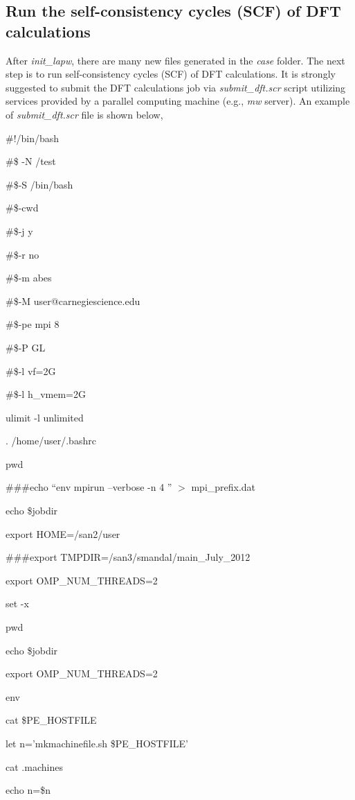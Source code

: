 \documentclass[12 pt]{article}
\begin{document}
  \cleardoublepage

      \subsection{Run the self-consistency cycles (SCF) of DFT calculations}

  After \emph{init\_lapw}, there are many new files generated in the \emph{case} folder. The next step is 
to run self-consistency cycles (SCF) of DFT calculations. It is strongly suggested to submit the DFT calculations 
job via \emph{submit\_dft.scr} script utilizing services provided by a parallel computing machine (e.g., \emph{mw}
 server). An example of \emph{submit\_dft.scr} file is shown below,

{\color{cyan}

  \#!/bin/bash

  \#\$ -N /test

  \#\$-S /bin/bash

  \#\$-cwd

  \#\$-j y

  \#\$-r no

  \#\$-m abes

  \#\$-M user@carnegiescience.edu

  \#\$-pe mpi 8

  \#\$-P GL

  \#\$-l vf=2G

  \#\$-l h\_vmem=2G

  ulimit -l unlimited

  . /home/user/.bashrc

  pwd

  \#\#\#echo ``env mpirun --verbose -n 4 '' $>$ mpi\_prefix.dat

  echo \$jobdir

  export HOME=/san2/user

  \#\#\#export TMPDIR=/san3/smandal/main\_July\_2012

  export OMP\_NUM\_THREADS=2

  set -x

  pwd

  echo \$jobdir

  export OMP\_NUM\_THREADS=2

  env

  cat \$PE\_HOSTFILE

  let n='mkmachinefile.sh \$PE\_HOSTFILE'

  cat .machines

  echo n=\$n

}
\end{document}
